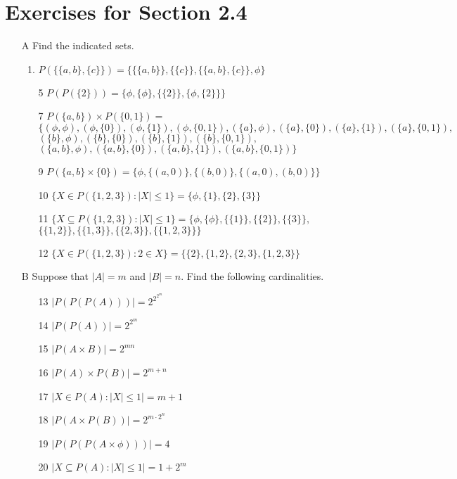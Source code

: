 \documentclass[12pt]{article}
\begin{document}
\section*{Exercises for Section 2.4}
\begin{itemize}
	\item [A] Find the indicated sets.
	    \begin{enumerate}
		\item $P(\{\{a,b\}, \{c\}\}) = \{\{\{a,b\}\}, \{\{c\}\}, \{\{a,b\}, \{c\}\}, \phi\}$
		\item [5] $P(P(\{2\})) = \{\phi, \{\phi\}, \{\{2\}\}, \{\phi, \{2\}\}\}$
		\item [7] $P(\{a,b\})\times P(\{0, 1\}) =$\\
		    $\{(\phi, \phi), (\phi, \{0\}), (\phi, \{1\}), (\phi, \{0,1\}), (\{a\}, \phi), (\{a\}, \{0\}), (\{a\}, \{1\}), (\{a\}, \{0,1\}),$\\
		    $(\{b\}, \phi), (\{b\}, \{0\}), (\{b\}, \{1\}), (\{b\}, \{0,1\}),$\\
		    $(\{a,b\}, \phi), (\{a,b\}, \{0\}), (\{a,b\}, \{1\}), (\{a,b\}, \{0,1\})\}$
		\item [9] $P(\{a,b\}\times\{0\}) = \{\phi, \{(a,0)\}, \{(b,0)\}, \{(a,0), (b,0)\}\}$
		\item [10] $\{X \in P(\{1,2,3\}): |X| \le 1\} = \{\phi, \{1\}, \{2\}, \{3\}\}$
		\item [11] $\{X \subseteq P(\{1,2,3\}): |X| \le 1\} = \{\phi, \{\phi\}, \{\{1\}\}, \{\{2\}\}, \{\{3\}\},$\\
		    $\{\{1,2\}\}, \{\{1,3\}\},\{\{2,3\}\}, \{\{1,2,3\}\}\}$
		\item [12] $\{X \in P(\{1,2,3\}): 2\in X\} = \{\{2\}, \{1,2\}, \{2,3\},\{1,2,3\}\}$
	    \end{enumerate}
	\item [B] Suppose that $|A|=m$ and $|B|=n $. Find the following cardinalities.
	    \begin{itemize}
		\item [13] $|P(P(P(A)))| = 2^{2^{2^m}}$
		\item [14] $|P(P(A))| = 2^{2^m}$
		\item [15] $|P(A\times B)| = 2^{mn}$
		\item [16] $|P(A)\times P(B)| = 2^{m+n}$
		\item [17] $|{X \in P(A): |X| \le 1}| = m+1$
		\item [18] $|P(A\times P(B))| = 2^{m\cdot 2^n}$
		\item [19] $|P(P(P(A\times \phi)))| = 4$ 
		\item [20] $|{X \subseteq P(A): |X| \le 1}| = 1+2^m$
	    \end{itemize}
\end{itemize}
\end{document}
